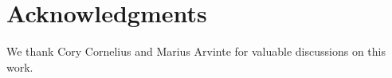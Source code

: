 \section{Acknowledgments}

We thank Cory Cornelius and Marius Arvinte for valuable discussions on this work.